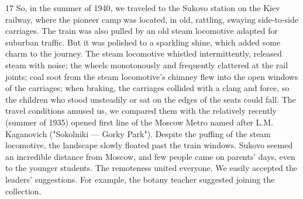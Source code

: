 17
{
So, in the summer of 1940, we traveled to the Sukovo station on the Kiev railway, where the pioneer camp was located, in old, rattling, swaying side-to-side carriages. The train was also pulled by an old steam locomotive adapted for suburban traffic. But it was polished to a sparkling shine, which added some charm to the journey. The steam locomotive whistled intermittently, released steam with noise; the wheels monotonously and frequently clattered at the rail joints; coal soot from the steam locomotive's chimney flew into the open windows of the carriages; when braking, the carriages collided with a clang and force, so the children who stood unsteadily or sat on the edges of the seats could fall. The travel conditions amused us, we compared them with the relatively recently (summer of 1935) opened first line of the Moscow Metro named after L.M. Kaganovich ("Sokolniki — Gorky Park"). Despite the puffing of the steam locomotive, the landscape slowly floated past the train windows. Sukovo seemed an incredible distance from Moscow, and few people came on parents' days, even to the younger students. The remoteness united everyone. We easily accepted the leaders' suggestions. For example, the botany teacher suggested joining the collection.
}

